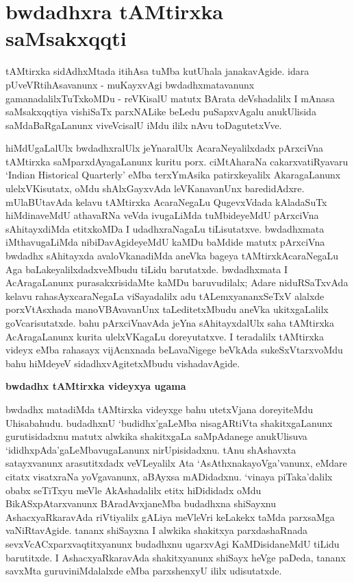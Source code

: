\chapter{bwdadhxra tAMtirxka saMsakxqqti}\label{chap003}

tAMtirxka sidAdhxMtada itihAsa tuMba kutUhala janakavAgide. idara pUveVRtihAsa\-vanunx - muKayxvAgi bwdadhxmatavanunx gamanadalilxTuTxkoMDu - reVKisalU matutx BArata deVshadalilx I mAnasa saMsakxqqtiya vishiSaTx parxNALike beLedu puSapxvAgalu anukUlisida saMdaBaRgaLanunx viveVcisalU iMdu ililx nAvu toDagutetxVve.

hiMdUgaLalUlx bwdadhxralUlx jeYnaralUlx AcaraNeyalilxdadx pArxciVna tAMtirxka saMparxdAyagaLanunx kuritu porx. ciMtAharaNa cakarxvatiRyavaru {\rm`Indian Historical Quarterly'} eMba terxYmAsika patirxkeyalilx AkaragaLanunx ulelxVKisutatx, oMdu shAlxGayxvAda leVKanavanUnx baredidAdxre. mUlaBUtavAda kelavu tAMtirxka AcaraNegaLu QugevxVdada kAladaSuTx hiMdinaveMdU athavaRNa veVda ivugaLiMda tuMbideyeMdU pArxciVna sAhitayxdiMda etitxkoMDa I udadhxraNagaLu tiLisutatxve. bwdadhxmata iMthavugaLiMda nibiDavAgideyeMdU kaMDu baMdide matutx pArxciVna bwdadhx sAhitayxda avaloVkanadiMda aneVka bageya tAMtirxkAcaraNegaLu Aga baLakeyalilxdadxveMbudu tiLidu barutatxde. bwdadhxmata I AcAragaLanunx purasakxrisidaMte kaMDu baruvudilalx; Adare niduRSaTxvAda kelavu rahasAyxcaraNegaLa viSayadalilx adu tALemxyananxSeTxV alalxde porxVtAsxhada manoVBAvavanUnx taLeditetxMbudu aneVka ukitxgaLalilx goVcarisutatxde. bahu pArxciVnavAda jeYna sAhitayxdalUlx saha tAMtirxka AcAragaLanunx kurita ulelxVKagaLu doreyutatxve. I teradalilx tAMtirxka videyx eMba rahasayx vijAcnxnada beLavaNigege beVkAda sukeSxVtarxvoMdu bahu hiMdeyeV sidadhxvAgitetxMbudu vishadavAgide.

\bigskip
\begin{center}
{\Large\bf bwdadhx tAMtirxka videyxya ugama}
\end{center}

bwdadhx matadiMda tAMtirxka videyxge bahu utetxVjana doreyiteMdu Uhisabahudu. budadhxnU `budidhx'gaLeMba nisagARtiVta shakitxgaLanunx gurutisidadxnu matutx alwkika shakitxgaLa saMpAdanege anukUlisuva `ididhxpAda'gaLeMbavugaLanunx nirUpisidadxnu. tAnu shAshavxta satayxvanunx arasutitxdadx veVLeyalilx Ata `AsAthxnakayoVga'vanunx, eMdare citatx visatxraNa yoVgavanunx, aBAyxsa mADidadxnu. `vinaya piTaka'dalilx obabx seTiTxyu meVle AkAshadalilx etitx hiDididadx oMdu BikASxpAtarxvanunx BAradAvxjaneMba budadhxna shiSayxnu AshacxyaRkaravAda riVtiyalilx gALiya meVleVri keLakekx taMda parxsaMga vaNiRtavAgide. tananx shiSayxna I alwkika shakitxya parxdashaRnada sevxVcACxparxvaqtitxyanunx budadhxnu ugarxvAgi KaMDisidaneMdU tiLidu barutitxde. I AshacxyaRkaravAda shakitxyanunx shiSayx heVge paDeda, tananx savxMta guruviniMdalalxde eMba parxshenxyU ililx udisutatxde.

